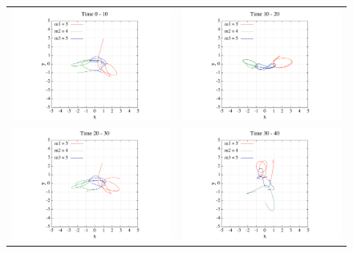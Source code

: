 \documentclass[11pt,a4paper,oneside,onecolumn]{jarticle}
\begin{document}
\begin{figure}[H]
\begin{tabular}{cc}
\begin{minipage}[t]{0.45\hsize}
\centering
\includegraphics[width=8cm]{./image/pythagoras_orbit_0to10.pdf}
\end{minipage} &
\begin{minipage}[t]{0.45\hsize}
\centering
\includegraphics[width=8cm]{./image/pythagoras_orbit_10to20.pdf}
\end{minipage}\\
%
\begin{minipage}[t]{0.45\hsize}
\centering
\includegraphics[width=8cm]{./image/pythagoras_orbit_20to30.pdf}
\end{minipage} &
\begin{minipage}[t]{0.45\hsize}
\centering
\includegraphics[width=8cm]{./image/pythagoras_orbit_30to40.pdf}

\end{minipage}
\end{tabular}
\end{figure}
\end{document}
